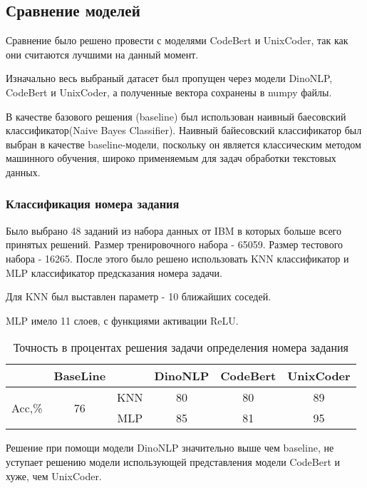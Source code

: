 \documentclass[../part_3.tex]{subfiles}
\begin{document}
\subsection{Сравнение моделей}
\par Сравнение было решено провести с моделями CodeBert и UnixCoder, так как они считаются лучшими на данный момент.
\par Изначально весь выбраный датасет был пропущен через модели DinoNLP, CodeBert и UnixCoder, а полученные вектора сохранены в numpy файлы.
\par В качестве базового решения (baseline) был использован наивный баесовский классификатор(Naive Bayes Classifier). Наивный байесовский классификатор был выбран в качестве baseline-модели, поскольку он является классическим методом машинного обучения, широко применяемым для задач обработки текстовых данных.  
\subsubsection{Классификация номера задания}
\par Было выбрано 48 заданий из набора данных от IBM в которых больше всего принятых решений. Размер тренировочного набора - 65059. Размер тестового набора - 16265. После этого было решено использовать KNN классификатор и MLP классификатор предсказания номера задачи.
\par Для KNN был выставлен параметр - 10 ближайших соседей.
\par MLP имело 11 слоев, с функциями активации ReLU.
\begin{table}[H]
    \centering
    \begin{tabular}{|c|c||c|c|c|c|}\hline 
        &BaseLine&&DinoNLP&CodeBert&UnixCoder\\ \hline 
        \multirow{2}{*}{Acc,\%}&\multirow{2}{*}{76}&KNN&80&80&89\\\cline{3-6}
        &&MLP&85&81&95\\\hline
    \end{tabular}  
    \caption{Точность в процентах решения задачи определения номера задания}
\end{table}
\par Решение при помощи модели DinoNLP значительно выше чем baseline, не уступает решению модели использующей представления модели CodeBert и хуже, чем UnixCoder.
\end{document}
